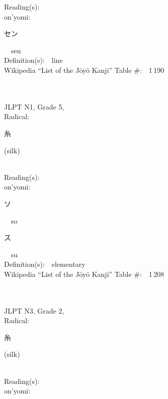 \begin{multicols}{2}
Reading(s):\ \ \\
{\hspace*{1em}}on'yomi:\ \ \\
{\hspace*{2em}}{\begin{CJK}{UTF8}{min} セン \end{CJK}}\ \ sen\ \ \\
Definition(s):\ \ line \\
Wikipedia ``List of the J\=oy\=o Kanji'' Table \#:\ \ 1\,190 \\
\ \ \\
{\fontsize{34pt}{40pt}  }\ \ \\  %
{JLPT N1, Grade 5, \\Radical:\ \ {\begin{CJK}{UTF8}{min} 糸 \end{CJK}} (silk) } \\
Reading(s):\ \ \\
{\hspace*{1em}}on'yomi:\ \ \\
{\hspace*{2em}}{\begin{CJK}{UTF8}{min} ソ \end{CJK}}\ \ so\ \ \\
{\hspace*{2em}}{\begin{CJK}{UTF8}{min} ス \end{CJK}}\ \ su\ \ \\
Definition(s):\ \ elementary \\
Wikipedia ``List of the J\=oy\=o Kanji'' Table \#:\ \ 1\,208 \\
\ \ \\
{\fontsize{34pt}{40pt}  }\ \ \\  %
{JLPT N3, Grade 2, \\Radical:\ \ {\begin{CJK}{UTF8}{min} 糸 \end{CJK}} (silk) } \\
Reading(s):\ \ \\
{\hspace*{1em}}on'yomi:\ \ \\

\end{multicols}

